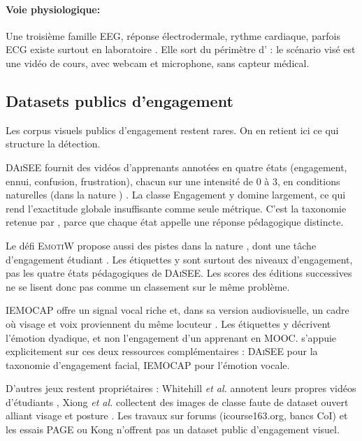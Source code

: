 \paragraph{Voie physiologique:}
Une troisième famille EEG, réponse électrodermale, rythme cardiaque,
parfois ECG existe surtout en laboratoire
\cite{picard1997affective,dmello2015review,abedi2021improving}. Elle sort du
périmètre d'\emolearn{} : le scénario visé est une vidéo de cours, avec
webcam et microphone, sans capteur médical.

\subsection{Datasets publics d'engagement}
\label{sec:ea-detection-datasets}

Les corpus visuels publics d'engagement restent rares. On en
retient ici ce qui structure la détection.

\textsc{DAiSEE} fournit des vidéos d'apprenants annotées en quatre états
(engagement, ennui, confusion, frustration), chacun sur une intensité de
0 à 3, en conditions naturelles (\og dans la nature \fg{})
\cite{gupta2016daisee}. La classe Engagement y domine largement, ce qui
rend l'exactitude globale insuffisante comme seule métrique. C'est la taxonomie retenue par
\emolearn{}, parce que chaque état appelle une réponse pédagogique
distincte.

Le défi \textsc{EmotiW} propose aussi des pistes \og dans la nature \fg{}, dont une
tâche d'engagement étudiant \cite{dhall2018emotiw}. Les étiquettes y sont
surtout des niveaux d'engagement, pas les quatre états
pédagogiques de \textsc{DAiSEE}. Les scores des éditions successives ne se
lisent donc pas comme un classement sur le même problème.

\textsc{IEMOCAP} offre un signal vocal riche et, dans sa version
audiovisuelle, un cadre où visage et voix proviennent du même locuteur
\cite{busso2008iemocap}. Les étiquettes y décrivent l'émotion dyadique,
et non l'engagement d'un apprenant en MOOC. \emolearn{} s'appuie
explicitement sur ces deux ressources complémentaires : \textsc{DAiSEE}
pour la taxonomie d'engagement facial, \textsc{IEMOCAP} pour l'émotion
vocale.

D'autres jeux restent propriétaires : Whitehill \emph{et al.}
annotent leurs propres vidéos d'étudiants \cite{whitehill2014faces}, 
Xiong \emph{et al.} collectent des images de classe faute de dataset
ouvert alliant visage et posture \cite{xiong2024cnntransformer}. Les
travaux sur forums (icourse163.org, bancs CoI) et les essais PAGE ou Kong
n'offrent pas un dataset public d'engagement visuel.

